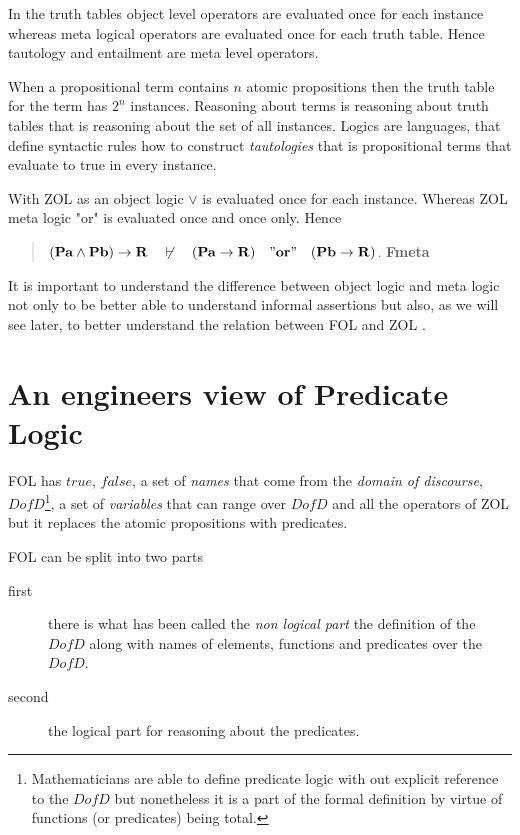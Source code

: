 In the truth tables object level operators are evaluated once for each instance whereas  meta logical operators are evaluated once for each  truth table. Hence tautology and entailment are meta level operators. 
 
 
\def\firstcircle{(0,0) circle (1.5cm)}
\def\secondcircle{(45:2cm) circle (1.5cm)}
\def\thirdcircle{(0:2cm) circle (1.5cm)}

When a propositional term contains $n$ atomic propositions  then the truth table for the term has $2^n$ instances. Reasoning about terms is reasoning about truth tables that is reasoning about  the set  of all instances. Logics are languages, that define syntactic rules how to construct \emph{tautologies} that is  propositional terms that evaluate to true in every instance.


With ZOL as an object logic $\vee$ is evaluated once for each instance. Whereas ZOL meta logic "or" is evaluated once and once only. Hence
\begin{quotation}
{\bf  $\mathbf{(Pa\wedge Pb)   \rightarrow R}\quad\not\vdash \quad\mathbf{(Pa\rightarrow R){\mathbf \quad"or"\quad } (Pb\rightarrow R)}$}. \hspace{\fill} {\bf Fmeta}
\end{quotation}
It is important to understand the difference between object logic and meta logic not only to be better able to understand informal assertions  but also, as we will see later, to better understand the relation between FOL and ZOL .

\section{An engineers view of  Predicate Logic}\label{sec:FOL}


FOL has $true$, $false$, a set of \emph{names} that come from the \emph{domain of discourse}, $DofD$\footnote{Mathematicians are able to define predicate logic with out explicit reference to the $DofD$ but nonetheless it is a part of the formal definition by virtue of functions (or predicates) being  total.}, a set of \emph{variables} that can range over $DofD$ and  all the operators of ZOL but it replaces the atomic propositions with predicates.  

FOL can be split into two parts 
\begin{description}
\item [first] there is what has been called the \emph{non logical part} the definition of the $DofD$ along with names of elements, functions and predicates over the $DofD$.  
\item [second] the logical part for reasoning about the predicates.
\end{description}

